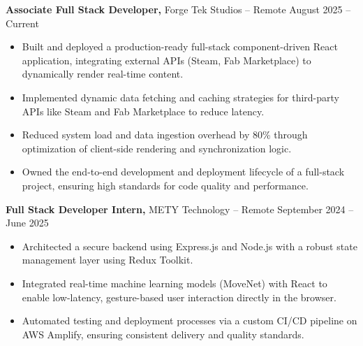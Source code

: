 \documentclass[11pt]{article}       %
\begin{document}
\textbf{Associate Full Stack Developer,} {Forge Tek Studios} -- Remote \hfill August 2025 -- Current 
\vspace{-9pt}
\begin{itemize}
  \item Built and deployed a production-ready full-stack component-driven React application, integrating external APIs (Steam, Fab Marketplace) to dynamically render real-time content.
  \item Implemented dynamic data fetching and caching strategies for third-party APIs like Steam and Fab Marketplace to reduce latency.
  \item Reduced system load and data ingestion overhead by 80\% through optimization of client-side rendering and synchronization logic.
  \item Owned the end-to-end development and deployment lifecycle of a full-stack project, ensuring high standards for code quality and performance.
\end{itemize}

\textbf{Full Stack Developer Intern,} {METY Technology} -- Remote \hfill September 2024 -- June 2025 
\vspace{-9pt}
\begin{itemize}
  \item Architected a secure backend using Express.js and Node.js with a robust state management layer using Redux Toolkit.
  \item Integrated real-time machine learning models (MoveNet) with React to enable low-latency, gesture-based user interaction directly in the browser.
  \item Automated testing and deployment processes via a custom CI/CD pipeline on AWS Amplify, ensuring consistent delivery and quality standards.
\end{itemize}

\end{document}
